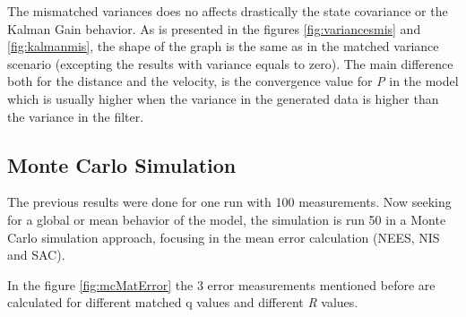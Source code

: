 \documentclass{article}
\begin{document}
        The mismatched variances does no affects drastically the state covariance or the Kalman Gain behavior. As is presented
        in the figures \ref{fig:variancesmis} and \ref{fig:kalmanmis}, the shape of the graph is the same as in the matched
        variance scenario (excepting the results with variance equals to zero). The main difference both for the distance and the 
        velocity, is the convergence value for \textit{P} in the model which is usually higher when the variance in the generated data
        is higher than the variance in the filter. 

        \subsection{Monte Carlo Simulation}

        The previous results were done for one run with 100 measurements. Now seeking for a global or mean behavior of the model, the simulation
        is run 50 in a Monte Carlo simulation approach, focusing in the mean error calculation (NEES, NIS and SAC).

        In the figure \ref{fig:mcMatError} the 3 error measurements mentioned before are calculated for different matched q values and
        different \textit{R} values.
\end{document}
